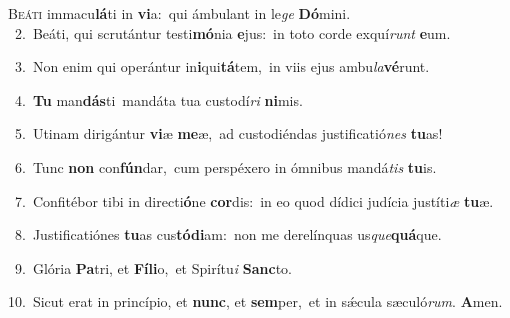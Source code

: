 \lettrine{\initial\textcolor{\initialcolor}{B}}{eáti} immacu\-\textbf{lá}\-ti in \textbf{vi}\-a:~\star qui ámbulant in le\textit{ge} \textbf{Dó}\-mini.\\
{\numbfont\textcolor{\numbcolor}{~2.}}~Beáti, qui scrutántur testi\-\textbf{mó}\-nia \textbf{e}\-jus:~\star in toto corde exquí\textit{runt} \textbf{e}\-um.\par
{\numbfont\textcolor{\numbcolor}{~3.}}~Non enim qui operántur in\-\textbf{i}\-qui\-\textbf{tá}\-tem,~\star in viis ejus ambu\-\textit{la}\-\textbf{vé}runt.\par
{\numbfont\textcolor{\numbcolor}{~4.}}~\textbf{Tu} man\-\textbf{dás}\-ti~\star mandáta tua custodí\textit{ri} \textbf{ni}\-mis.\par
{\numbfont\textcolor{\numbcolor}{~5.}}~Utinam dirigántur \textbf{vi}\-æ \textbf{me}\-æ,~\star ad custodiéndas justificatió\textit{nes} \textbf{tu}\-as!\par
{\numbfont\textcolor{\numbcolor}{~6.}}~Tunc \textbf{non} con\-\textbf{fún}\-dar,~\star cum perspéxero in ómnibus mandá\textit{tis} \textbf{tu}\-is.\par
{\numbfont\textcolor{\numbcolor}{~7.}}~Confitébor tibi in directi\-\textbf{ó}\-ne \textbf{cor}\-dis:~\star in eo quod dídici judícia justíti\textit{æ} \textbf{tu}\-æ.\par
{\numbfont\textcolor{\numbcolor}{~8.}}~Justificatiónes \textbf{tu}\-as cus\-\textbf{tó}\-\textbf{di}am:~\star non me derelínquas us\-\textit{que}\-\textbf{quá}que.\par
{\numbfont\textcolor{\numbcolor}{~9.}}~Glória \textbf{Pa}\-tri, et \textbf{Fí}\-\textbf{li}o,~\star et Spirítu\textit{i} \textbf{Sanc}\-to.\par
{\numbfont\textcolor{\numbcolor}{10.}}~Sicut erat in princípio, et \textbf{nunc}\-, et \textbf{sem}\-per,~\star et in sǽcula sæculó\-\textit{rum}\-. \textbf{A}\-men.\par
